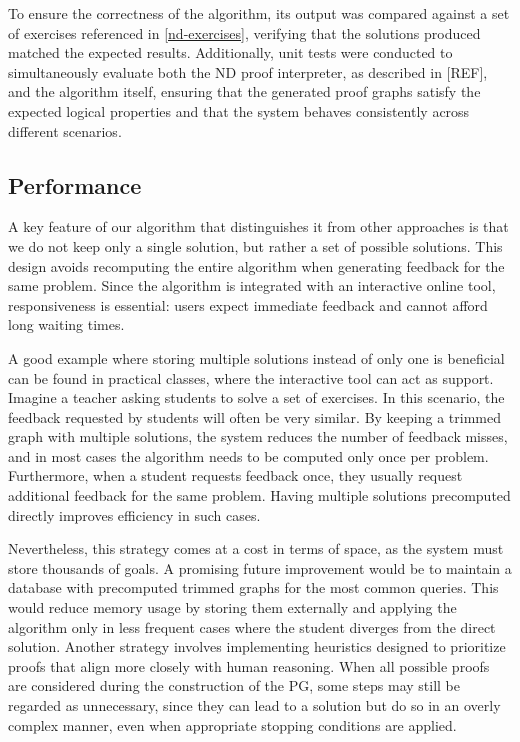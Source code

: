To ensure the correctness of the algorithm, its output was compared against a set of exercises referenced in \autoref{nd-exercises}, verifying that the solutions produced matched the expected results. Additionally, unit tests were conducted to simultaneously evaluate both the ND proof interpreter, as described in [REF], and the algorithm itself, ensuring that the generated proof graphs satisfy the expected logical properties and that the system behaves consistently across different scenarios.

\subsection{Performance}
A key feature of our algorithm that distinguishes it from other approaches is that we do not keep only a single solution, but rather a set of possible solutions. This design avoids recomputing the entire algorithm when generating feedback for the same problem. Since the algorithm is integrated with an interactive online tool, responsiveness is essential: users expect immediate feedback and cannot afford long waiting times. 

A good example where storing multiple solutions instead of only one is beneficial can be found in practical classes, where the interactive tool can act as support. Imagine a teacher asking students to solve a set of exercises. In this scenario, the feedback requested by students will often be very similar. By keeping a trimmed graph with multiple solutions, the system reduces the number of feedback misses, and in most cases the algorithm needs to be computed only once per problem. Furthermore, when a student requests feedback once, they usually request additional feedback for the same problem. Having multiple solutions precomputed directly improves efficiency in such cases.

Nevertheless, this strategy comes at a cost in terms of space, as the system must store thousands of goals. A promising future improvement would be to maintain a database with precomputed trimmed graphs for the most common queries. This would reduce memory usage by storing them externally and applying the algorithm only in less frequent cases where the student diverges from the direct solution. Another strategy involves implementing heuristics designed to prioritize proofs that align more closely with human reasoning. When all possible proofs are considered during the construction of the \gls{PG}, some steps may still be regarded as unnecessary, since they can lead to a solution but do so in an overly complex manner, even when appropriate stopping conditions are applied.

